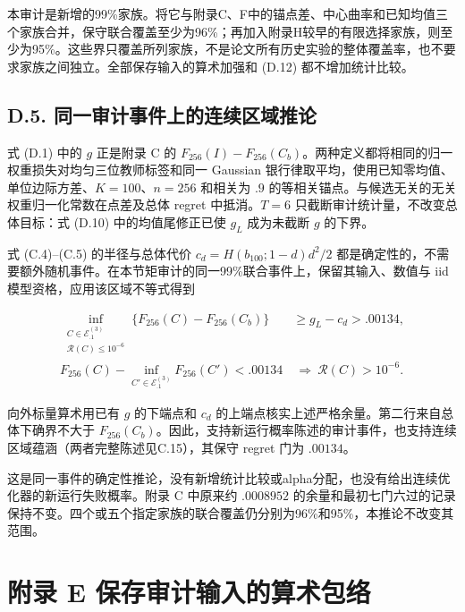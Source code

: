 \documentclass[11pt,a4paper]{article}
\begin{document}
本审计是新增的99\%家族。将它与附录C、F中的锚点差、中心曲率和已知均值三个家族合并，保守联合覆盖至少为96\%；再加入附录H较早的有限选择家族，则至少为95\%。这些界只覆盖所列家族，不是论文所有历史实验的整体覆盖率，也不要求家族之间独立。全部保存输入的算术加强和
(D.12) 都不增加统计比较。

\newpage

\subsection*{D.5.
同一审计事件上的连续区域推论}\label{d.5.-ux540cux4e00ux5ba1ux8ba1ux4e8bux4ef6ux4e0aux7684ux8fdeux7eedux533aux57dfux63a8ux8bba}

式 (D.1) 中的 \(g\) 正是附录 C 的
\(F_{256}(I)-F_{256}(C_b)\)。两种定义都将相同的归一权重损失对均匀三位教师标签和同一
Gaussian
银行律取平均，使用已知零均值、单位边际方差、\(K=100\)、\(n=256\)
和相关为 \(.9\) 的等相关锚点。与候选无关的无关权重归一化常数在点差及总体
regret 中抵消。\(T=6\) 只截断审计统计量，不改变总体目标：式 (D.10)
中的均值尾修正已使 \(g_L\) 成为未截断 \(g\) 的下界。

式 (C.4)--(C.5) 的半径与总体代价 \(c_d=H(b_{100};1-d)d^2/2\)
都是确定性的，不需要额外随机事件。在本节矩审计的同一99\%联合事件上，保留其输入、数值与
iid 模型资格，应用该区域不等式得到

\[
\begin{aligned}
\inf_{\substack{C\in\mathcal E_{.1}^{(3)}\\\mathcal R(C)\le10^{-6}}}
\{F_{256}(C)-F_{256}(C_b)\}
&\ge g_L-c_d>.00134,\\
F_{256}(C)-\inf_{C'\in\mathcal E_{.1}^{(3)}}F_{256}(C')<.00134
&\ \Longrightarrow\ \mathcal R(C)>10^{-6}.
\end{aligned}
\tag{D.14}
\]

向外标量算术用已有 \(g\) 的下端点和 \(c_d\)
的上端点核实上述严格余量。第二行来自总体下确界不大于
\(F_{256}(C_b)\)。因此，支持新运行概率陈述的审计事件，也支持连续区域蕴涵（两者完整陈述见C.15），其保守
regret 门为 \(.00134\)。

这是同一事件的确定性推论，没有新增统计比较或alpha分配，也没有给出连续优化器的新运行失败概率。附录
C 中原来约 \(.0008952\)
的余量和最初七门六过的记录保持不变。四个或五个指定家族的联合覆盖仍分别为96\%和95\%，本推论不改变其范围。

\clearpage

\section*{附录 E
保存审计输入的算术包络}\label{ux9644ux5f55-e-ux4fddux5b58ux5ba1ux8ba1ux8f93ux5165ux7684ux7b97ux672fux5305ux7edc}
\end{document}
